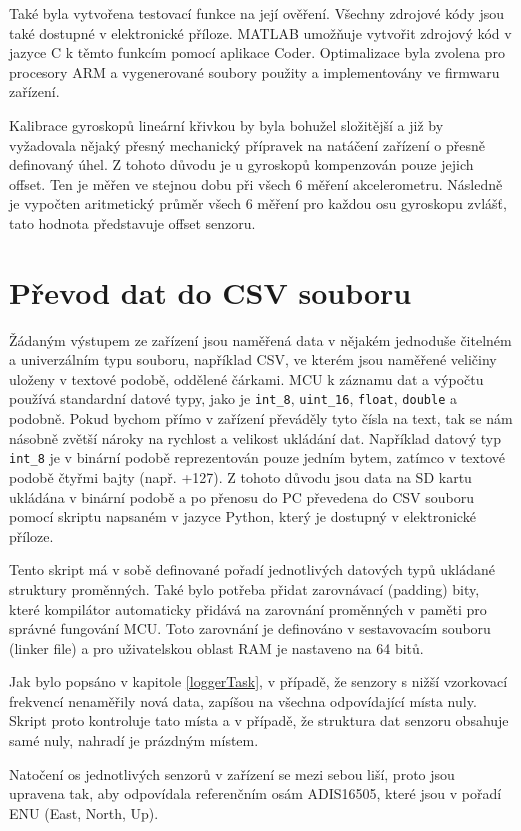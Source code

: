 Také byla vytvořena testovací funkce na její ověření. Všechny zdrojové kódy jsou také dostupné v elektronické příloze. MATLAB umožňuje vytvořit zdrojový kód v jazyce C k těmto funkcím pomocí aplikace Coder. Optimalizace byla zvolena pro procesory ARM a vygenerované soubory použity a implementovány ve firmwaru zařízení. 

Kalibrace gyroskopů lineární křivkou by byla bohužel složitější a již by vyžadovala nějaký přesný mechanický přípravek na natáčení zařízení o přesně definovaný úhel. Z tohoto důvodu je u gyroskopů kompenzován pouze jejich offset. Ten je měřen ve stejnou dobu při všech 6 měření akcelerometru. Následně je vypočten aritmetický průměr všech 6 měření pro každou osu gyroskopu zvlášť, tato hodnota představuje offset senzoru.

\section{Převod dat do CSV souboru}
Žádaným výstupem ze zařízení jsou naměřená data v nějakém jednoduše čitelném a univerzálním typu souboru, například \ac{CSV}, ve kterém jsou naměřené veličiny uloženy v textové podobě, oddělené čárkami. \ac{MCU} k záznamu dat a výpočtu používá standardní datové typy, jako je \texttt{int\_8}, \texttt{uint\_16}, \texttt{float}, \texttt{double} a podobně. Pokud bychom přímo v zařízení převáděly tyto čísla na text, tak se nám násobně zvětší nároky na rychlost a velikost ukládání dat. Například datový typ \texttt{int\_8} je v binární podobě reprezentován pouze jedním bytem, zatímco v textové podobě čtyřmi bajty (např. +127). Z tohoto důvodu jsou data na SD kartu ukládána v binární podobě a po přenosu do PC převedena do \ac{CSV} souboru pomocí skriptu napsaném v jazyce Python, který je dostupný v elektronické příloze.

Tento skript má v sobě definované pořadí jednotlivých datových typů ukládané struktury proměnných. Také bylo potřeba přidat zarovnávací (padding) bity, které kompilátor automaticky přidává na zarovnání proměnných v paměti pro správné fungování MCU. Toto zarovnání je definováno v sestavovacím souboru (linker file) a pro uživatelskou oblast RAM je nastaveno na 64 bitů.

Jak bylo popsáno v kapitole \ref{loggerTask}, v případě, že senzory s nižší vzorkovací frekvencí nenaměřily nová data, zapíšou na všechna odpovídající místa nuly. Skript proto kontroluje tato místa a v případě, že struktura dat senzoru obsahuje samé nuly, nahradí je prázdným místem.

Natočení os jednotlivých senzorů v zařízení se mezi sebou liší, proto jsou upravena tak, aby odpovídala referenčním osám ADIS16505, které jsou v pořadí ENU (East, North, Up).





